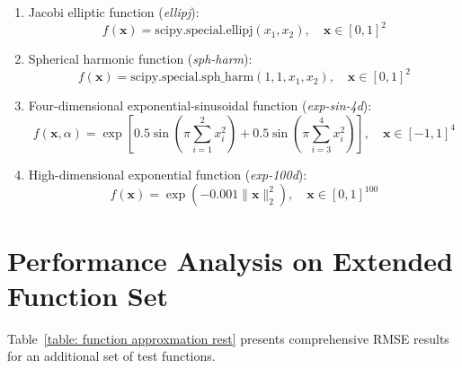 \begin{enumerate}
    \item Jacobi elliptic function (\textit{ellipj}):
    \begin{equation}
        f(\boldsymbol{x})=\text{scipy.special.ellipj}(x_1,x_2), \quad \boldsymbol{x}\in [0,1]^{2}
    \end{equation}
    
    \item Spherical harmonic function (\textit{sph-harm}):
    \begin{equation}
        f(\boldsymbol{x})=\text{scipy.special.sph\_harm}(1,1,x_1,x_2), \quad \boldsymbol{x}\in [0,1]^{2}           
    \end{equation}
    
    \item Four-dimensional exponential-sinusoidal function (\textit{exp-sin-4d}):
    \begin{equation}
        f(\boldsymbol{x}, \alpha)=\exp\left[0.5\sin\left(\pi\sum_{i=1}^2 x_i^2\right)+0.5\sin\left(\pi\sum_{i=3}^4 x_i^2\right)\right],\quad \boldsymbol{x}\in [-1,1]^{4}
    \end{equation}
    
    \item High-dimensional exponential function (\textit{exp-100d}):
    \begin{equation}
        f(\boldsymbol{x})=\exp(-0.001\|\boldsymbol{x}\|_2^2),\quad \boldsymbol{x}\in [0,1]^{100}
    \end{equation}
\end{enumerate}

\section{Performance Analysis on Extended Function Set}
Table~\ref{table: function approxmation rest} presents comprehensive RMSE results for an additional set of test functions.

